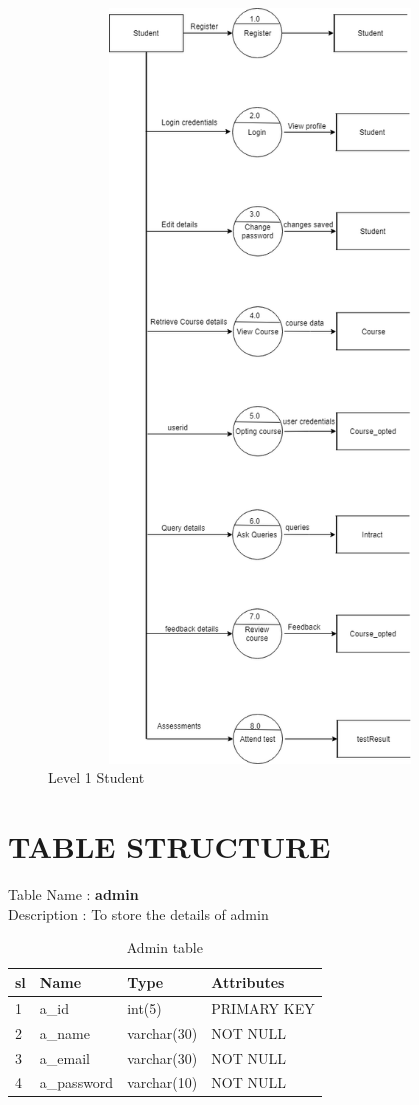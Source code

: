 \begin{figure}
  \includegraphics[height=20cm,width=12cm]{StudentDFDlevel1.png}
  \caption{ Level 1 Student}
  \label{fig1:Data Flow Diagram Level 1 : Student}
\end{figure}
%
%
%
\chapter{TABLE STRUCTURE}
\begin{table}[!h]
Table Name    :    {\bf admin}\\
Description      :  To store the details of admin


\begin{tabular}{|l|l|l|l|}
\hline
{\bf sl }&{ \bf Name}&{ \bf Type}  &{ \bf Attributes} \\ 
\hline
1  & a\_id       & int(5)      & PRIMARY KEY \\ 
\hline
2  & a\_name     & varchar(30) &    NOT NULL         \\ 
\hline
3  & a\_email    & varchar(30) &    NOT NULL         \\ 
\hline
4  & a\_password & varchar(10) &      NOT NULL       \\ 
\hline
\end{tabular}
\caption{Admin table}
\end{table}


